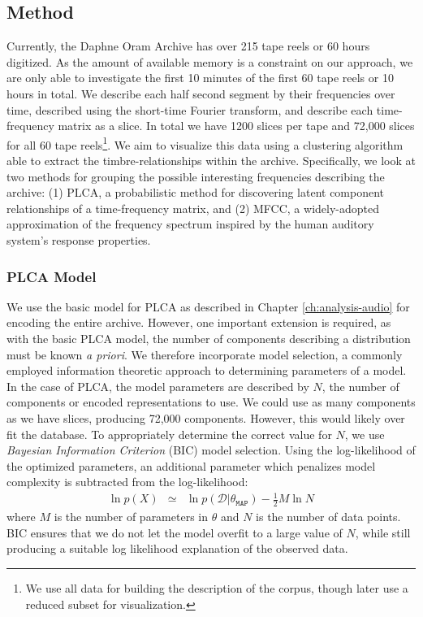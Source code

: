\documentclass[a4paper,10pt,final]{ThesisStyle}
\begin{document}
\subsection{Method}

Currently, the Daphne Oram Archive has over 215 tape reels or 60 hours digitized.  As the amount of available memory is a constraint on our approach, we are only able to investigate the first 10 minutes of the first 60 tape reels or 10 hours in total.  We describe each half second segment by their frequencies over time, described using the short-time Fourier transform, and describe each time-frequency matrix as a slice.  In total we have 1200 slices per tape and 72,000 slices for all 60 tape reels\footnote{We use all data for building the description of the corpus, though later use a reduced subset for visualization.}.  We aim to visualize this data using a clustering algorithm able to extract the timbre-relationships within the archive.  Specifically, we look at two methods for grouping the possible interesting frequencies describing the archive: (1) PLCA, a probabilistic method for discovering latent component relationships of a time-frequency matrix, and (2) MFCC, a widely-adopted approximation of the frequency spectrum inspired by the human auditory system's response properties.

\subsubsection{PLCA Model}
We use the basic model for PLCA as described in Chapter \ref{ch:analysis-audio} for encoding the entire archive.  However, one important extension is required, as with the basic PLCA model, the number of components describing a distribution must be known \textit{a priori}.  We therefore incorporate model selection, a commonly employed information theoretic approach to determining parameters of a model.  In the case of PLCA, the model parameters are described by $N$, the number of components or encoded representations to use.  We could use as many components as we have slices, producing 72,000 components.  However, this would likely over fit the database.  To appropriately determine the correct value for $N$, we use \textit{Bayesian Information Criterion} (BIC) model selection.  Using the log-likelihood of the optimized parameters, an additional parameter which penalizes model complexity is subtracted from the log-likelihood:
\begin{eqnarray}
\ln{p(X)} &\simeq& \ln{p(\mathcal{D}|\theta_{\mathtt{MAP}})} - \frac{1}{2}M\ln{N}
\end{eqnarray}
where $M$ is the number of parameters in $\theta$ and $N$ is the number of data points.  BIC ensures that we do not let the model overfit to a large value of $N$, while still producing a suitable log likelihood explanation of the observed data.
\end{document}
